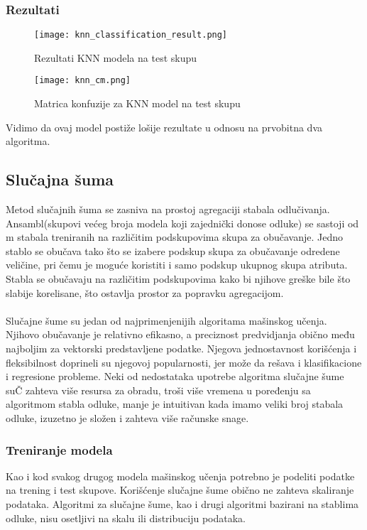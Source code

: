 \documentclass[a4paper,12pt]{article}
\begin{document}
\subsubsection{Rezultati}

\begin{figure}[H]
\centering
\texttt{[image: knn\_classification\_result.png]}
\caption{Rezultati KNN modela na test skupu}
\label{fig:knn_classification_result}
\end{figure}

\begin{figure}[H]
\centering
\texttt{[image: knn\_cm.png]}
\caption{Matrica konfuzije za KNN model na test skupu}
\label{fig:knn_cm}
\end{figure}

Vidimo da ovaj model postiže lošije rezultate u odnosu na prvobitna dva algoritma.

\subsection{Slučajna šuma}
Metod slučajnih šuma se zasniva na prostoj agregaciji stabala odlučivanja.
Ansambl(skupovi većeg broja modela koji zajednički donose odluke) se sastoji od m stabala treniranih na različitim podskupovima skupa za obučavanje. Jedno stablo se obučava tako što se izabere podskup skupa za obučavanje odredene veličine, pri čemu je moguće koristiti i samo podskup ukupnog skupa atributa. Stabla se obučavaju na različitim podskupovima kako bi njihove greške bile što slabije korelisane, što ostavlja prostor za popravku agregacijom.
\\\\Slučajne šume su jedan od najprimenjenijih algoritama mašinskog učenja.
Njihovo obučavanje je relativno efikasno, a preciznost predvidjanja obično među
najboljim za vektorski predstavljene podatke. Njegova jednostavnost korišćenja i fleksibilnost doprineli su njegovoj popularnosti, jer može da rešava i klasifikacione i regresione probleme. Neki od nedostataka upotrebe algoritma slučajne šume suČ zahteva više resursa za obradu, troši više vremena u poređenju sa algoritmom stabla odluke, manje je intuitivan kada imamo veliki broj stabala odluke, izuzetno je složen i zahteva više računske snage.

\subsubsection{Treniranje modela}
Kao i kod svakog drugog modela mašinskog učenja potrebno je podeliti podatke na
trening i test skupove. Korišćenje slučajne šume obično ne zahteva skaliranje podataka. Algoritmi za slučajne šume, kao i drugi algoritmi bazirani na stablima odluke, nisu osetljivi na skalu ili distribuciju podataka.
\end{document}
